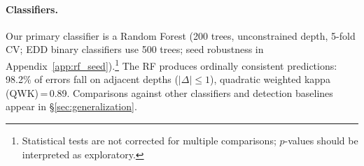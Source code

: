 \paragraph{Classifiers.}
Our primary classifier is a Random Forest (200 trees, unconstrained depth, 5-fold CV; EDD binary classifiers use 500 trees; seed robustness in Appendix~\ref{app:rf_seed}).\footnote{Statistical tests are not corrected for multiple comparisons; $p$-values should be interpreted as exploratory.}
The RF produces ordinally consistent predictions: 98.2\% of errors fall on adjacent depths ($|\Delta| \leq 1$), quadratic weighted kappa (QWK)\,=\,0.89.
Comparisons against other classifiers and detection baselines appear in \S\ref{sec:generalization}.